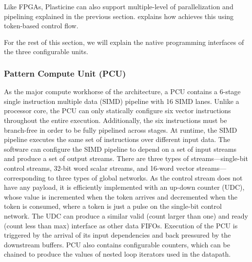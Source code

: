 Like FPGAs, Plasticine can also support multiple-level of parallelization and pipelining explained
in the previous section.  explains how \name achieves this using token-based
control flow.

For the rest of this section, we will explain the native programming interfaces of the three
configurable units.

\subsubsection{Pattern Compute Unit (PCU)}
As the major compute workhorse of the architecture, a PCU contains a 6-stage single instruction
multiple data (SIMD) pipeline with 16 SIMD lanes. 
Unlike a processor core, the PCU can only statically configure six vector instructions throughout the
entire execution.
Additionally, the six instructions must be branch-free in order to be fully pipelined across stages.
At runtime, the SIMD pipeline executes the same set of instructions over different input data.
The software can configure the SIMD pipeline to depend on a set of input streams and
produce a set of output streams. 
There are three types of streams---single-bit control streams, 32-bit word scalar streams, and
16-word vector streams---corresponding to three types of global networks.
As the control stream does not have any payload, it is efficiently implemented with an up-down counter
(UDC), whose value is incremented when the token arrives and decremented when the token is consumed,
where a token is just a pulse on the single-bit control network.
The UDC can produce a similar valid (count larger than one) and ready (count less than max) interface as other data FIFOs. 
Execution of the PCU is triggered by the arrival of its input dependencies and back pressured by
the downstream buffers.
PCU also contains configurable counters, which can be chained to produce the values of nested
loop iterators used in the datapath. 


